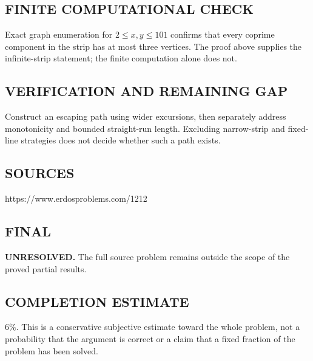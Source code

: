 \subsection*{FINITE COMPUTATIONAL CHECK}
Exact graph enumeration for $2\le x,y\le101$ confirms that every coprime component in the strip has at most three vertices. The proof above supplies the infinite-strip statement; the finite computation alone does not.

\subsection*{VERIFICATION AND REMAINING GAP}
Construct an escaping path using wider excursions, then separately address
monotonicity and bounded straight-run length. Excluding narrow-strip and fixed-line
strategies does not decide whether such a path exists.

\subsection*{SOURCES}
https://www.erdosproblems.com/1212

\subsection*{FINAL}
\textbf{UNRESOLVED.} The full source problem remains outside the scope of the proved partial results.

\subsection*{COMPLETION ESTIMATE}
$6\%$. This is a conservative subjective estimate toward the whole problem, not a probability that the argument is correct or a claim that a fixed fraction of the problem has been solved.
